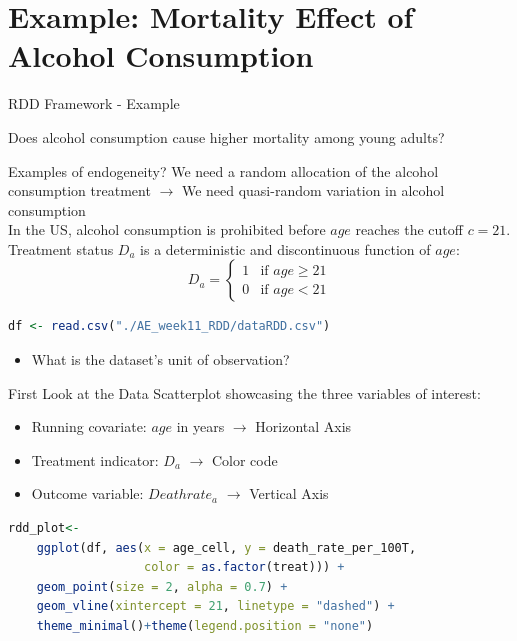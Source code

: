 \documentclass[9pt,aspectratio=169, xcolor=dvipsnames]{beamer}
\begin{document}
\section{Example: Mortality Effect of Alcohol Consumption}

\begin{frame}[fragile]{RDD Framework - Example}
\linespread{1.3}\selectfont %
	\begin{center}
		Does alcohol consumption \alert{cause} higher mortality among young adults?
	\end{center} \pause
	Examples of endogeneity? \pause We need a random allocation of the alcohol consumption treatment
	$\rightarrow$ 	We need quasi-random variation in alcohol consumption
		\pause
		\bigskip
		\\
		In the US, alcohol consumption is prohibited before $age$ reaches the cutoff \textbf{$c=21$}.
		\medskip
		\\
		Treatment status $D_a$ is a \alert{deterministic} and \alert{discontinuous} function of $age$:
		\[
		D_a =
		\begin{cases}
		1 & \text{if } age \ge 21 \\
		0 & \text{if } age < 21
		\end{cases}
		\]
	\vspace{0.2cm}
	\pause
	\begin{lstlisting}[language=R]
	df <- read.csv("./AE_week11_RDD/dataRDD.csv")
		\end{lstlisting}
	\vspace{-0.2cm}
	\begin{itemize}
		\item[$\rightarrow$] What is the dataset's unit of observation?
	\end{itemize}
	\end{frame}

	\begin{frame}[fragile]{First Look at the Data}
	Scatterplot showcasing the three variables of interest:
	\begin{itemize}
		\item Running covariate: $age$ in years $\rightarrow$ Horizontal Axis
		\item Treatment indicator: $D_a$ $\rightarrow$ Color code
		\item Outcome variable: $Deathrate_a$ $\rightarrow$ Vertical Axis
	\end{itemize}
	\vspace{0.5cm}
	\pause
	\begin{lstlisting}[language=R]
	rdd_plot<-
	ggplot(df, aes(x = age_cell, y = death_rate_per_100T,
 			       color = as.factor(treat))) +
	geom_point(size = 2, alpha = 0.7) +
	geom_vline(xintercept = 21, linetype = "dashed") +
	theme_minimal()+theme(legend.position = "none")
		\end{lstlisting}
	\end{frame}
	
\end{document}
